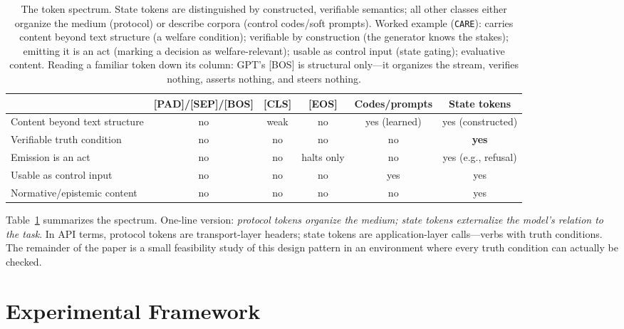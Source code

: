 \documentclass[manuscript, screen, review]{jair}
\newcommand{\care}{\texttt{CARE}}
\begin{document}
\begin{table}[t]
\centering
\caption{The token spectrum. State tokens are distinguished by constructed, verifiable semantics; all other classes either organize the medium (protocol) or describe corpora (control codes/soft prompts). Worked example (\care): carries content beyond text structure (a welfare condition); verifiable by construction (the generator knows the stakes); emitting it is an act (marking a decision as welfare-relevant); usable as control input (state gating); evaluative content. Reading a familiar token down its column: GPT's [BOS] is structural only---it organizes the stream, verifies nothing, asserts nothing, and steers nothing.}
\label{tab:taxonomy}
\footnotesize
\setlength{\tabcolsep}{3pt}
\begin{tabular}{l c c c c c}
\toprule
 & [PAD]/[SEP]/[BOS] & [CLS] & [EOS] & Codes/prompts & State tokens \\
\midrule
Content beyond text structure & no & weak & no & yes (learned) & yes (constructed) \\
Verifiable truth condition & no & no & no & no & \textbf{yes} \\
Emission is an act & no & no & halts only & no & yes (e.g., refusal) \\
Usable as control input & no & no & no & yes & yes \\
Normative/epistemic content & no & no & no & no & yes \\
\bottomrule
\end{tabular}
\end{table}

Table~\ref{tab:taxonomy} summarizes the spectrum. One-line version: \emph{protocol tokens organize the medium; state tokens externalize the model's relation to the task}. In API terms, protocol tokens are transport-layer headers; state tokens are application-layer calls---verbs with truth conditions. The remainder of the paper is a small feasibility study of this design pattern in an environment where every truth condition can actually be checked.

\section{Experimental Framework}
\label{sec:framework}
\end{document}
